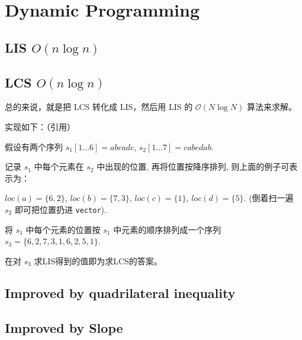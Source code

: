 \section{Dynamic Programming}

\subsection{LIS $O(n\log{n})$}


\subsection{LCS $O(n\log{n})$}

总的来说，就是把 LCS 转化成 LIS，然后用 LIS 的 $\mathcal{O}(N\log{N})$ 算法来求解。

实现如下：（引用）

假设有两个序列 $s_1[1\dots{6}] = abcadc$, $s_2[1\dots{7}] = cabedab$.

记录 $s_1$ 中每个元素在 $s_2$ 中出现的位置, 再将位置按降序排列, 则上面的例子可表示为：

$loc(a) = \{ 6, 2 \}$,
$loc( b ) = \{ 7, 3 \}$,
$loc( c ) = \{ 1 \}$, 
$loc( d ) = \{ 5 \}$.
(倒着扫一遍 $s_2$ 即可把位置扔进 \verb|vector|).

将 $s_1$ 中每个元素的位置按 $s_1$ 中元素的顺序排列成一个序列
$s_3 = \{ 6, 2, 7, 3, 1, 6, 2, 5, 1 \}$.

在对 $s_3$ 求LIS得到的值即为求LCS的答案。


\subsection{Improved by quadrilateral inequality}


\subsection{Improved by Slope}


